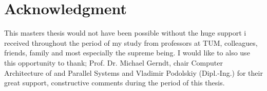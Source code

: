 \chapter*{Acknowledgment}
\setcounter{page}{1}




This masters thesis would not have been possible without the huge support i received throughout the period of my study from professors at TUM, colleagues, friends, family and most especially the supreme being. I would like to also use this opportunity to thank; Prof. Dr. Michael Gerndt, chair Computer Architecture of and Parallel Systems and Vladimir Podolskiy (Dipl.-Ing.) for their great support, constructive comments during the period of this thesis.

\cleardoublepage{}
